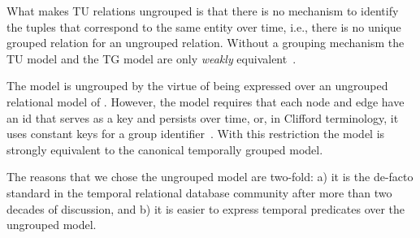 
What makes TU relations ungrouped is that there is no mechanism to
identify the tuples that correspond to the same entity over time,
i.e., there is no unique grouped relation for an ungrouped relation.
Without a grouping mechanism the TU model and the TG model are only
{\em weakly} equivalent~\cite{Clifford1994}.

The \tg model is ungrouped by the virtue of being expressed over an
ungrouped relational model of \tra.  However, the \tg model requires
that each node and edge have an id that serves as a key and persists
over time, or, in Clifford terminology, it uses constant keys for a
group identifier~\cite{Clifford1994}.  With this restriction the \tga
model is strongly equivalent to the canonical temporally grouped model.

The reasons that we chose the ungrouped model are two-fold: a) it is
the de-facto standard in the temporal relational database community
after more than two decades of discussion, and b) it is easier to
express temporal predicates over the ungrouped model.

